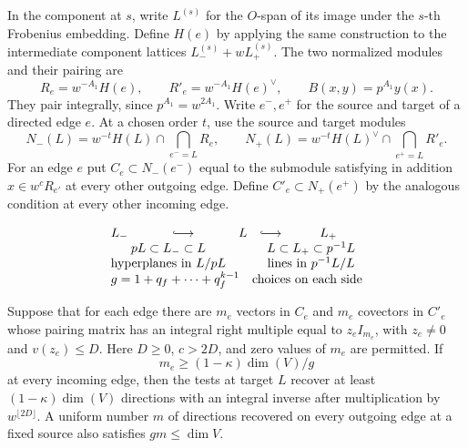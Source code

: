 In the component at
\(s\), write \(L^{(s)}\) for the \(O\)-span of its image under
the \(s\)-th Frobenius embedding. Define \(H(e)\) by applying
the same construction to the intermediate component lattices
\(L_-^{(s)}+w L_+^{(s)}\). The two normalized modules and their
pairing are
\[
 R_e=w^{-A_1}H(e),\qquad R'_e=w^{-A_1}H(e)^\vee,\qquad
 B(x,y)=p^{A_1}y(x).
\]
They pair integrally, since \(p^{A_1}=w^{2A_1}\).
Write \(e^-,e^+\) for the source and target of a directed edge
\(e\). At a chosen order \(t\), use the source and target modules
\[
 N_-(L)=w^{-t}H(L)\cap\!\bigcap_{e^-=L}R_e,\qquad
 N_+(L)=w^{-t}H(L)^\vee\cap\!\bigcap_{e^+=L}R'_e .
\]
For an edge \(e\) put \(C_e\subset N_-(e^-)\) equal to the
submodule satisfying in addition \(x\in w^cR_{e'}\) at every
other outgoing edge. Define \(C'_e\subset N_+(e^+)\) by the
analogous condition at every other incoming edge.

\begin{construction}
\[
\begin{array}{ccccc}
L_-&\lhook\joinrel\longrightarrow& L &\lhook\joinrel\longrightarrow &L_+\\
\multicolumn{2}{c}{pL\subset L_-\subset L}&&\multicolumn{2}{c}{L\subset L_+\subset p^{-1}L}\\
\multicolumn{2}{c}{\text{hyperplanes in }L/pL}&&\multicolumn{2}{c}{\text{lines in }p^{-1}L/L}\\
\multicolumn{5}{c}{g=1+q_f+\cdots+q_f^{k-1}\quad\text{choices on each side}}
\end{array}
\]
\caption{The incoming and outgoing families of a vertex have the same cardinality. Incoming tests are combined at a common target, whereas the outgoing rank bound counts directions at a common source.}\label{fig:incident-lattice-edges}
\end{construction}

\begin{proposition}\label{prop:incident-edge-tests}
Suppose that for each edge there are \(m_e\) vectors in
\(C_e\) and \(m_e\) covectors in \(C'_e\) whose pairing matrix
has an integral right multiple equal to \(z_e I_{m_e}\), with
\(z_e\ne0\) and \(v(z_e)\le D\). Here \(D\ge0\), \(c>2D\), and zero values of \(m_e\) are permitted. If
\[
                m_e\ge (1-\kappa)\dim(V)/g
\]
at every incoming edge, then the tests at target \(L\) recover
at least \((1-\kappa)\dim(V)\) directions with an integral
inverse after multiplication by \(w^{\lfloor 2D\rfloor}\). A uniform number \(m\) of directions
recovered on every outgoing edge at a fixed source also satisfies
\(gm\le\dim V\).
\end{proposition}

